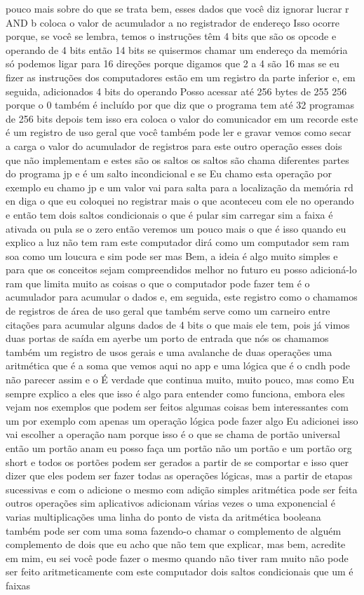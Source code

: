 \documentclass[oneside,11pt]{memoir} %
\begin{document}
pouco mais sobre do que se trata  bem, esses dados que você diz ignorar  lucrar r AND b coloca o valor de  acumulador a no registrador de endereço  Isso ocorre porque, se você se lembra, temos o  instruções têm 4 bits que são os  opcode e operando de 4 bits  então 14 bits se quisermos  chamar um endereço da memória  só podemos ligar para 16  direções porque digamos que 2 a 4 são  16 mas se eu fizer as instruções  dos computadores estão em um registro  da parte inferior e, em seguida, adicionados 4  bits do operando  Posso acessar até 256 bytes de 255  256 porque o 0 também é incluído por  que diz que o programa tem até 32  programas de 256 bits depois tem isso  era coloca o valor do comunicador em  um recorde  este é um registro de uso geral que  você também pode ler e gravar  vemos como secar a carga o valor do  acumulador de registros para este outro  operação esses dois que não implementam  e estes são os saltos os saltos são  chama diferentes partes do programa jp  e é um salto incondicional e se  Eu chamo esta operação  por exemplo eu chamo jp e um valor vai para  salta para a localização da memória rd en  diga o que eu coloquei no  registrar mais o que aconteceu com ele no  operando e então tem dois saltos  condicionais o que é pular sim carregar sim  a faixa é ativada ou pula se o zero  então veremos um pouco mais  o que é isso quando eu explico a luz  não tem ram este computador dirá  como um computador sem ram soa como um  loucura e sim pode ser mas  Bem, a ideia é algo muito simples e  para que os conceitos sejam compreendidos  melhor no futuro eu posso adicioná-lo  ram que limita muito as coisas  o que o computador pode fazer  tem é o acumulador para acumular o  dados e, em seguida, este registro como o  chamamos de registros de área de uso geral  que também serve como um carneiro entre  citações para acumular alguns dados de 4  bits  o que mais ele tem, pois já vimos duas portas  de saída em ayerbe um porto de entrada  que nós os chamamos  também um registro de usos gerais e  uma avalanche de duas operações uma  aritmética que é a soma que vemos  aqui no app e uma lógica que é  o cndh pode não parecer assim e o  É verdade que continua muito, muito pouco, mas como  Eu sempre explico a eles que isso é algo para  entender como funciona, embora eles vejam  nos exemplos que podem ser feitos  algumas coisas bem interessantes  com um por exemplo com apenas um  operação lógica pode fazer algo  Eu adicionei isso vai escolher a operação nam  porque isso é o que se chama de  portão universal  então um portão anam eu posso  faça um portão não um portão  e um portão org short e todos os  portões podem ser gerados a partir de  se comportar e isso quer dizer que eles podem ser  fazer todas as operações lógicas, mas  a partir de etapas sucessivas e com o  adicione o mesmo com adição simples  aritmética pode ser feita outros  operações sim  aplicativos adicionam várias vezes o  uma exponencial é varias  multiplicações uma linha do  ponto de vista da aritmética booleana  também pode ser com uma soma  fazendo-o chamar o complemento de alguém  complemento de dois que eu acho que não  tem que explicar, mas bem, acredite em mim, eu sei  você pode fazer o mesmo quando não tiver ram  muito não pode ser feito  aritmeticamente com este computador  dois saltos condicionais que um é  faixas 
\end{document}
